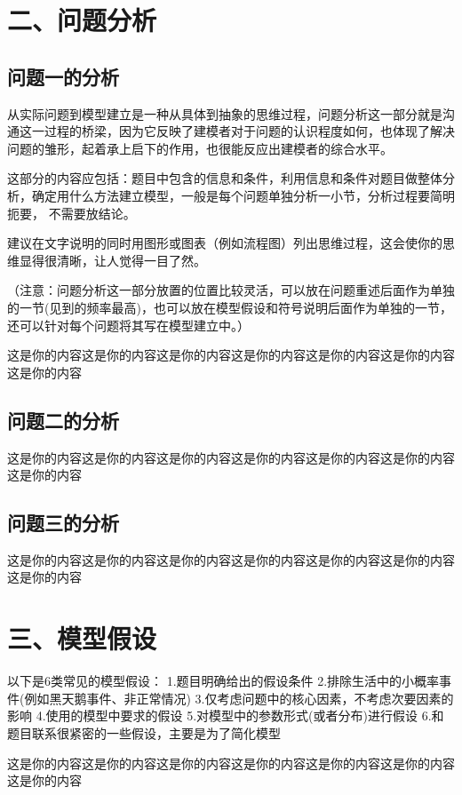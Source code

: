 \documentclass{my_paper}
\begin{document}
\section{二、问题分析}
\subsection{问题一的分析}
从实际问题到模型建立是一种从具体到抽象的思维过程，问题分析这一部分就是沟通这一过程的桥梁，因为它反映了建模者对于问题的认识程度如何，也体现了解决问题的雏形，起着承上启下的作用，也很能反应出建模者的综合水平。

这部分的内容应包括：题目中包含的信息和条件，利用信息和条件对题目做整体分析，确定用什么方法建立模型，一般是每个问题单独分析一小节，分析过程要简明扼要， 不需要放结论。

建议在文字说明的同时用图形或图表（例如流程图）列出思维过程，这会使你的思维显得很清晰，让人觉得一目了然。

（注意：问题分析这一部分放置的位置比较灵活，可以放在问题重述后面作为单独的一节(见到的频率最高)，也可以放在模型假设和符号说明后面作为单独的一节，还可以针对每个问题将其写在模型建立中。）

这是你的内容这是你的内容这是你的内容这是你的内容这是你的内容这是你的内容这是你的内容
\subsection{问题二的分析}
这是你的内容这是你的内容这是你的内容这是你的内容这是你的内容这是你的内容这是你的内容
\subsection{问题三的分析}
这是你的内容这是你的内容这是你的内容这是你的内容这是你的内容这是你的内容这是你的内容
\section{三、模型假设}
以下是6类常见的模型假设：
1.题目明确给出的假设条件
2.排除生活中的小概率事件(例如黑天鹅事件、非正常情况)
3.仅考虑问题中的核心因素，不考虑次要因素的影响
4.使用的模型中要求的假设
5.对模型中的参数形式(或者分布)进行假设
6.和题目联系很紧密的一些假设，主要是为了简化模型

这是你的内容这是你的内容这是你的内容这是你的内容这是你的内容这是你的内容这是你的内容


\end{document}
